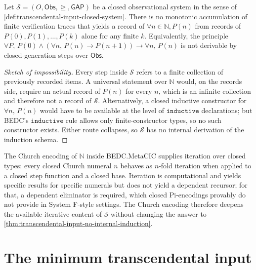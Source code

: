 \begin{theorem}
\label{thm:transcendental-input-no-internal-induction}
Let $\mathcal{S} = (O, \mathsf{Obs}, \trianglerighteq, \mathsf{GAP})$ be a closed observational system in the sense of \autoref{def:transcendental-input-closed-system}. There is no monotonic accumulation of finite verification traces that yields a record of $\forall n \in \mathbb{N}, P(n)$ from records of $P(0), P(1), \ldots, P(k)$ alone for any finite $k$. Equivalently, the principle $\forall P,\, P(0) \wedge (\forall n,\, P(n) \to P(n+1)) \to \forall n,\, P(n)$ is not derivable by closed-generation steps over $\mathsf{Obs}$.
\end{theorem}

\begin{proof}[Sketch of impossibility]
Every step inside $\mathcal{S}$ refers to a finite collection of previously recorded items. A universal statement over $\mathbb{N}$ would, on the records side, require an actual record of $P(n)$ for every $n$, which is an infinite collection and therefore not a record of $\mathcal{S}$. Alternatively, a closed inductive constructor for $\forall n,\, P(n)$ would have to be available at the level of $\texttt{inductive}$ declarations; but BEDC's $\texttt{inductive}$ rule allows only finite-constructor types, so no such constructor exists. Either route collapses, so $\mathcal{S}$ has no internal derivation of the induction schema.
\end{proof}

\begin{remark}
\label{rem:transcendental-input-church-no-bridge}
The Church encoding of $\mathbb{N}$ inside BEDC.MetaCIC supplies iteration over closed types: every closed Church numeral $n$ behaves as $n$-fold iteration when applied to a closed step function and a closed base. Iteration is computational and yields specific results for specific numerals but does not yield a dependent recursor; for that, a dependent eliminator is required, which closed Pi-encodings provably do not provide in System F-style settings. The Church encoding therefore deepens the available iterative content of $\mathcal{S}$ without changing the answer to \autoref{thm:transcendental-input-no-internal-induction}.
\end{remark}

\section{The minimum transcendental input}
\label{sec:transcendental-input-minimum}

